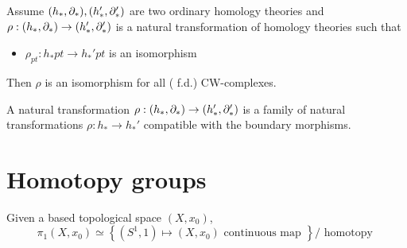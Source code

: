 \documentclass[../main.tex]{subfiles}
\begin{document}
\begin{thm}
	Assume $( h_\ast,\partial_\ast) , ( h_\ast', \partial_\ast') $ are two ordinary homology theories and $\rho: ( h_\ast,\partial_\ast) \to ( h_\ast',\partial_\ast') $ is a natural transformation of homology theories such that 
	\begin{itemize}
	\item $\rho_{pt} : h_\ast pt \to h_\ast'pt$ is an isomorphism
	\end{itemize}
	Then $\rho$ is an isomorphism for all ( f.d.) CW-complexes.
\end{thm}
\begin{defn}
	A natural transformation $\rho: ( h_\ast,\partial_\ast) \to ( h_\ast',\partial_\ast') $ is a family of natural transformations $\rho: h_\ast \to h_\ast'$ compatible with the boundary morphisms.
\end{defn}
\section{Homotopy groups}
Given a based topological space $( X,x_0) $,
\[ 
\pi_1( X,x_0) \simeq \left\{ ( S^{1},1) \mapsto ( X,x_0) \text{ continuous map }  \right\} / \text{ homotopy } 
\]
\end{document}
